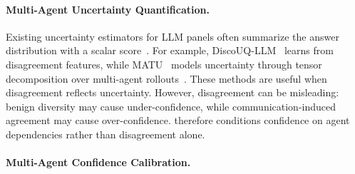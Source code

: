\paragraph{Multi-Agent Uncertainty Quantification.}
Existing uncertainty estimators for LLM panels often summarize the answer distribution with a scalar score~\citep{wang2023selfconsistencyimproveschainthought,kadavath2022languagemodelsmostlyknow,feng2025rethinkingllmuncertaintymultiagent,chen2026responsecountsquantifyinguncertainty,jiang2026discouq}.  
For example, DiscoUQ-LLM~\cite{jiang2026discouq} learns from disagreement features, while MATU~\cite{chen2026responsecountsquantifyinguncertainty} models uncertainty through tensor decomposition over multi-agent rollouts~\citep{jiang2026discouq, chen2026responsecountsquantifyinguncertainty}. These methods are useful when disagreement reflects uncertainty. 
However, disagreement can be misleading: benign diversity may cause under-confidence, while communication-induced agreement may cause over-confidence. \methodname{}  therefore conditions confidence on agent dependencies rather than disagreement alone.






\paragraph{Multi-Agent Confidence Calibration.}



